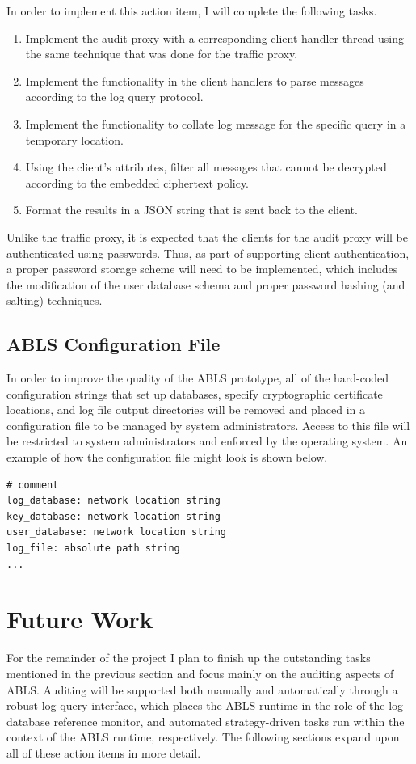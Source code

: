 \documentclass{sig-alternate}
\begin{document}
In order to implement this action item, I will complete the following tasks.

\begin{enumerate}
	\item Implement the audit proxy with a corresponding client handler thread using the same technique that was done for the traffic proxy. 
	\item Implement the functionality in the client handlers to parse messages according to the log query protocol.
	\item Implement the functionality to collate log message for the specific query in a temporary location.
	\item Using the client's attributes, filter all messages that cannot be decrypted according to the embedded ciphertext policy.
	\item Format the results in a JSON string that is sent back to the client.
\end{enumerate}

Unlike the traffic proxy, it is expected that the clients for the audit proxy will be authenticated using passwords. Thus, as
part of supporting client authentication, a proper password storage scheme will need to be implemented, which includes 
the modification of the user database schema and proper password hashing (and salting) techniques. 

\subsection{ABLS Configuration File} 
In order to improve the quality of the ABLS prototype, all of the hard-coded configuration strings that set up databases,
specify cryptographic certificate locations, and log file output directories will be removed and placed in a configuration file
to be managed by system administrators. Access to this file will be restricted to system administrators and enforced by the 
operating system. An example of how the configuration file might look is shown below.

\begin{lstlisting}
# comment
log_database: network location string
key_database: network location string
user_database: network location string
log_file: absolute path string
...
\end{lstlisting}

\section{Future Work}
For the remainder of the project I plan to finish up the outstanding tasks mentioned in the previous section and 
focus mainly on the auditing aspects of ABLS. Auditing will be supported both manually and automatically through
a robust log query interface, which places the ABLS runtime in the role of the log database reference monitor, and 
automated strategy-driven tasks run within the context of the ABLS runtime, respectively. The following 
sections expand upon all of these action items in more detail.
\end{document}
